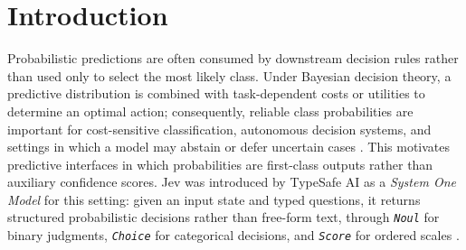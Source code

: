 \documentclass[twoside]{article}
\begin{document}
\section{Introduction}

Probabilistic predictions are often consumed by downstream decision rules rather than used only to select the most likely class. Under Bayesian decision theory, a predictive distribution is combined with task-dependent costs or utilities to determine an optimal action; consequently, reliable class probabilities are important for cost-sensitive classification, autonomous decision systems, and settings in which a model may abstain or defer uncertain cases \cite{gneiting2007proper,silvafilho2023classifier,chow1970optimum,elyaniv2010foundations}. This motivates predictive interfaces in which probabilities are first-class outputs rather than auxiliary confidence scores. Jev was introduced by TypeSafe AI as a \emph{System One Model} for this setting: given an input state and typed questions, it returns structured probabilistic decisions rather than free-form text, through \emph{\texttt{Noul}} for binary judgments, \emph{\texttt{Choice}} for categorical decisions, and \emph{\texttt{Score}} for ordered scales \cite{typesafe2026jev}.
\end{document}
